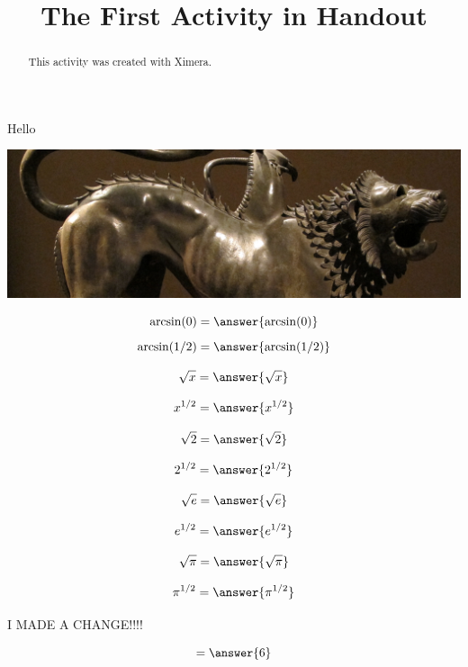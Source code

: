 \documentclass{ximera}
\title{The First Activity in Handout}
\begin{document}
  
\begin{abstract}  
This activity was created with Ximera.
\end{abstract}  
\maketitle

\begin{example}

Hello
\begin{image}
    \includegraphics{chimera.png}
  \end{image}

  \[
  \arcsin(0) = \answer{\arcsin(0)}
  \]
  \[
  \arcsin(1/2) = \answer{\arcsin(1/2)}
  \]



  
\[
\sqrt{x} = \answer{\sqrt{x}}
\]

\[
x^{1/2} = \answer{x^{1/2}}
\]

\[
\sqrt{2} = \answer{\sqrt{2}}
\]

\[
2^{1/2} = \answer{2^{1/2}}
\] 

\[
\sqrt{e} = \answer{\sqrt{e}}
\]


\[
e^{1/2} = \answer{e^{1/2}}
\] 




\[
\sqrt{\pi} = \answer{\sqrt{\pi}}
\]


\[
\pi^{1/2} = \answer{\pi^{1/2}}
\] 
\end{example}
I MADE A CHANGE!!!!


\begin{problem}  
  \begin{prompt}
    \[
    = \answer{6}
    \]
  \end{prompt}
\end{problem}
\end{document}
